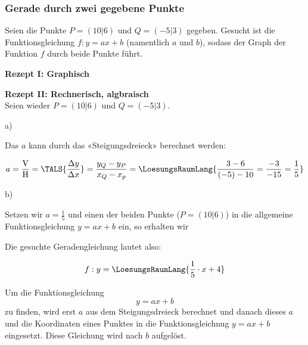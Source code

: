 \subsubsection{Gerade durch zwei gegebene Punkte}

Seien die Punkte $P=(10|6)$ und $Q=(-5|3)$ gegeben.
Gesucht ist die Funktionsgleichung $f: y=ax+b$ (namentlich $a$ und $b$), sodass
der Graph der Funktion $f$ durch beide Punkte führt.


\textbf{Rezept I: Graphisch}\\

\vspace{1mm}




\newpage

\textbf{Rezept II: Rechnerisch, algbraisch }\\

Seien wieder $P=(10|6)$ und $Q=(-5|3)$.
\vspace{1mm}

a)

Das $a$ kann durch das «Steigungsdreieck» berechnet werden:

$$a = \frac{\text{V}}{\text{H}}=\TALS{\frac{\Delta y}{\Delta x}}=\frac{y_Q-y_P}{x_Q-x_p} = \LoesungsRaumLang{\frac{3 - 6}{(-5) - 10} = \frac{-3}{-15} = \frac{1}{5}}$$

b)

Setzen wir $a=\frac{1}{5}$ und einen der beiden Punkte (\zB $P=(10|6)$) in die
allgemeine Funktionsgleichung $y=ax+b$ ein, so erhalten wir


Die gesuchte Geradengleichung lautet also:

$$f: y=\LoesungsRaumLang{\frac{1}{5}\cdot{}x + 4}$$

\begin{rezept}{}{}
Um die Funktionsgleichung $$y=ax+b$$ zu finden,
  wird erst $a$ aus dem Steigungsdreieck berechnet und danach dieses
  $a$ und die Koordinaten eines Punktes in die Funktionsgleichnug
  $y=ax+b$ eingesetzt. Diese Gleichung wird nach $b$ aufgelöst.
\end{rezept}
\newpage

